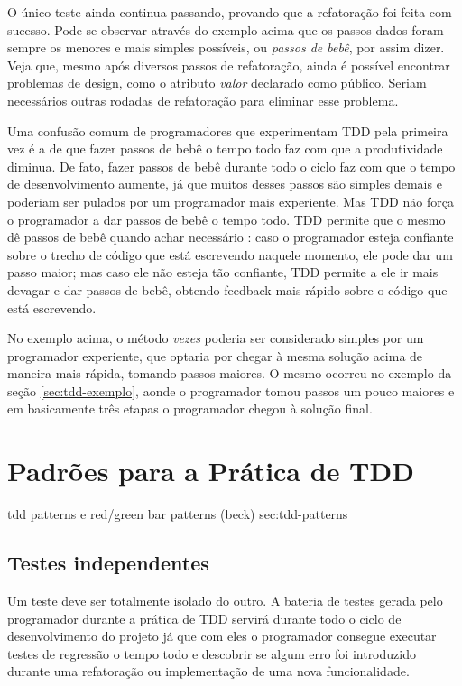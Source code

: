 O único teste ainda continua passando, provando que a refatoração foi feita com sucesso. Pode-se observar através
do exemplo acima que os passos dados foram sempre os menores e mais simples possíveis, ou \textit{passos de bebê}, por assim dizer. 
Veja que, mesmo após diversos passos de refatoração, ainda é possível encontrar problemas de design, como o atributo \textit{valor}
declarado como público. Seriam necessários outras rodadas de refatoração para eliminar esse problema.

Uma confusão comum de programadores que experimentam TDD pela primeira vez é a de que fazer passos de bebê o tempo todo faz
com que a produtividade diminua. De fato, fazer passos de bebê durante todo o ciclo faz com que o tempo de desenvolvimento aumente,
já que muitos desses passos são simples demais e poderiam ser pulados por um programador mais experiente. Mas TDD não força o programador
a dar passos de bebê o tempo todo. TDD permite que o mesmo dê passos de bebê quando achar necessário \cite{TDDByExample}: caso
o programador esteja confiante sobre o trecho de código que está escrevendo naquele momento, ele pode dar um passo maior; mas caso ele
não esteja tão confiante, TDD permite a ele ir mais devagar e dar passos de bebê, obtendo feedback mais rápido sobre o código que está escrevendo. 

No exemplo acima, o método \textit{vezes} poderia ser considerado simples por um programador experiente, que optaria por chegar à
mesma solução acima de maneira mais rápida, tomando passos maiores. O mesmo ocorreu no exemplo da seção \ref{sec:tdd-exemplo}, aonde o
programador tomou passos um pouco maiores e em basicamente três etapas o programador chegou à solução final.

\section{Padrões para a Prática de TDD}
\label{sec:tdd-patterns}

tdd patterns e red/green bar patterns (beck) sec:tdd-patterns

\subsection{Testes independentes}

Um teste deve ser totalmente isolado do outro. A bateria de testes gerada pelo programador durante a prática de TDD servirá
durante todo o ciclo de desenvolvimento do projeto já que com eles o programador consegue executar testes de regressão
o tempo todo e descobrir se algum erro foi introduzido durante uma refatoração ou implementação de uma nova funcionalidade.

